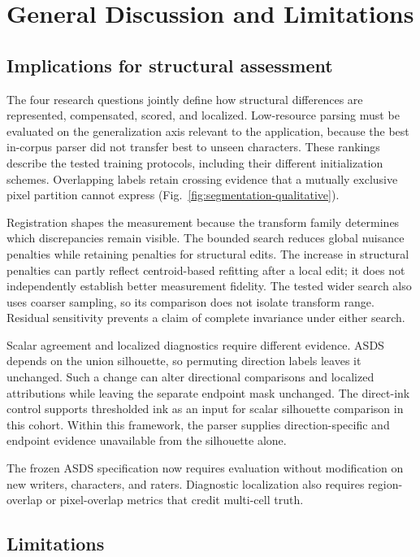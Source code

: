 \section{General Discussion and Limitations}
\label{sec:discussion}

\subsection{Implications for structural assessment}

The four research questions jointly define how structural differences are
represented, compensated, scored, and localized. Low-resource parsing must
be evaluated on the generalization axis relevant to the application,
because the best in-corpus parser did not transfer best to unseen
characters. These rankings describe the tested training protocols,
including their different initialization schemes. Overlapping labels retain
crossing evidence that a mutually exclusive pixel partition cannot express
(Fig.~\ref{fig:segmentation-qualitative}).

Registration shapes the measurement because the transform family
determines which discrepancies remain visible. The bounded search reduces
global nuisance penalties while retaining penalties for structural edits.
The increase in structural penalties can partly reflect centroid-based
refitting after a local edit; it does not independently establish better
measurement fidelity. The tested wider search also uses coarser sampling,
so its comparison does not isolate transform range. Residual sensitivity
prevents a claim of complete invariance under either search.

Scalar agreement and localized diagnostics require different evidence.
ASDS depends on the union silhouette, so permuting direction labels leaves
it unchanged. Such a change can alter directional comparisons and
localized attributions while leaving the separate endpoint mask unchanged.
The direct-ink control supports thresholded ink as an input for scalar
silhouette comparison in this cohort. Within this framework, the parser
supplies direction-specific and endpoint evidence unavailable from the
silhouette alone.

The frozen ASDS specification now requires evaluation without modification
on new writers, characters, and raters. Diagnostic localization also
requires region-overlap or pixel-overlap metrics that credit multi-cell
truth.

\subsection{Limitations}

